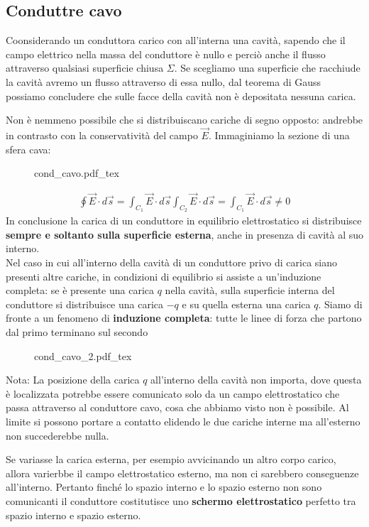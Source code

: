 \documentclass[x11names]{report}
\newcommand{\nota}[2]{
	\begin{attenzione}{Nota:}
		#2
	\end{attenzione}
}
\newcommand{\incfig}[1]{%
	{#1.pdf_tex}
}
\begin{document}
\subsection{Conduttre cavo}
Coonsiderando un conduttora carico con all'interna una cavità, sapendo che il campo elettrico nella massa del conduttore è nullo e perciò anche il flusso attraverso qualsiasi superficie chiusa \(\Sigma\). Se scegliamo una superficie che racchiude la cavità avremo un flusso attraverso di essa nullo, dal teorema di Gauss possiamo concludere che sulle facce della cavità non è depositata nessuna carica.

Non è nemmeno possibile che si distribuiscano cariche di segno opposto: andrebbe in contrasto con la  conservatività del campo \(\vec{E}\). Immaginiamo la sezione di una sfera cava:
\begin{figure}[H]
	\centering
	\incfig{cond_cavo}
\end{figure}
\begin{gather*}
	\oint \vec{E} \cdot d\vec{s} = \int_{C_1} \vec{E} \cdot d\vec{s} \int_{C_2} \vec{E} \cdot d\vec{s} = \int_{C_1} \vec{E} \cdot d\vec{s} \neq 0
\end{gather*}
In conclusione la carica di un conduttore in equilibrio elettrostatico si distribuisce \textbf{sempre e soltanto sulla superficie esterna}, anche in presenza di cavità al suo interno. \\

\noindent
Nel caso in cui all'interno della cavità di un conduttore privo di carica siano presenti altre cariche, in condizioni di equilibrio si assiste a un'induzione completa: se è presente una carica \(q\) nella cavità, sulla superficie interna del conduttore si distribuisce una carica \(-q\) e su quella esterna una carica \(q\). Siamo di fronte a un fenomeno di \textbf{induzione completa}: tutte le linee di forza che partono dal primo terminano sul secondo
\begin{figure}[H]
	\centering
	\incfig{cond_cavo_2}
\end{figure}
\nota{}{La posizione della carica \(q\) all'interno della cavità non importa, dove questa è localizzata potrebbe essere comunicato solo da un campo elettrostatico che passa attraverso al conduttore cavo, cosa che abbiamo visto non è possibile. Al limite si possono portare a contatto elidendo le due cariche interne ma all'esterno non succederebbe nulla.}

Se variasse la carica esterna, per esempio avvicinando un altro corpo carico, allora varierbbe il campo elettrostatico esterno, ma non ci sarebbero conseguenze all'interno. Pertanto finché lo spazio interno e lo spazio esterno non sono comunicanti il conduttore costitutisce uno \textbf{schermo elettrostatico} perfetto tra spazio interno e spazio esterno.
\end{document}
